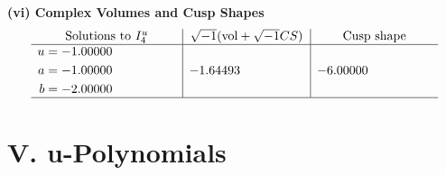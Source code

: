 \documentclass[1p]{elsarticle_modified}
\theoremstyle{definition}
\newcommand{\I}{\sqrt{-1}}
\begin{document}
\newpage\flushleft \textbf{(vi) Complex Volumes and Cusp Shapes}
$$\begin{array}{c|c|c}  
\text{Solutions to }I^u_{4}& \I (\text{vol} + \sqrt{-1}CS) & \text{Cusp shape}\\
 \hline 
\begin{aligned}
u &= -1.00000\phantom{ +0.000000I} \\
a &= -1.00000\phantom{ +0.000000I} \\
b &= -2.00000\phantom{ +0.000000I}\end{aligned}
 & -1.64493\phantom{ +0.000000I} & -6.00000\phantom{ +0.000000I}\\
 \hline 
 \end{array}$$\newpage
\newpage\renewcommand{\arraystretch}{1}
\centering \section*{ V. u-Polynomials}
\end{document}
